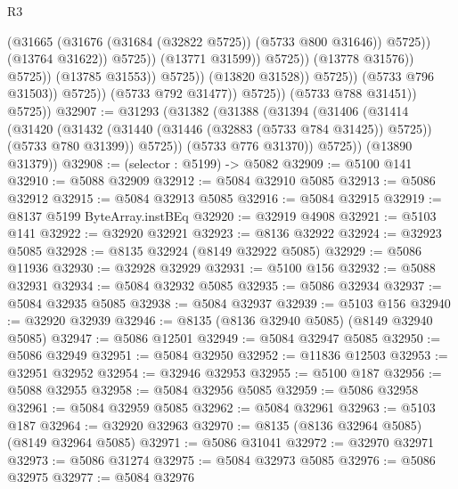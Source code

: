 \begin{lexlean}{R3}
\begin{coremodule}
                                                      (@31665
                                                        (@31676
                                                          (@31684 (@32822 @5725))
                                                          (@5733 @800 @31646))
                                                        @5725))
                                                    (@13764 @31622))
                                                  @5725))
                                              (@13771 @31599))
                                            @5725))
                                        (@13778 @31576))
                                      @5725))
                                  (@13785 @31553))
                                @5725))
                            (@13820 @31528))
                          @5725))
                      (@5733 @796 @31503))
                    @5725))
                (@5733 @792 @31477))
              @5725))
          (@5733 @788 @31451))
        @5725))
@32907 := @31293
    (@31382
      (@31388
        (@31394
          (@31406
            (@31414
              (@31420
                (@31432 (@31440 (@31446 (@32883 (@5733 @784 @31425)) @5725)) (@5733 @780 @31399))
                @5725))
            (@5733 @776 @31370))
          @5725))
      (@13890 @31379))
@32908 := (selector : @5199) -> @5082
@32909 := @5100 @141
@32910 := @5088 @32909
@32912 := @5084 @32910 @5085
@32913 := @5086 @32912
@32915 := @5084 @32913 @5085
@32916 := @5084 @32915
@32919 := @8137 @5199 ByteArray.instBEq
@32920 := @32919 @4908
@32921 := @5103 @141
@32922 := @32920 @32921
@32923 := @8136 @32922
@32924 := @32923 @5085
@32928 := @8135 @32924 (@8149 @32922 @5085)
@32929 := @5086 @11936
@32930 := @32928 @32929
@32931 := @5100 @156
@32932 := @5088 @32931
@32934 := @5084 @32932 @5085
@32935 := @5086 @32934
@32937 := @5084 @32935 @5085
@32938 := @5084 @32937
@32939 := @5103 @156
@32940 := @32920 @32939
@32946 := @8135 (@8136 @32940 @5085) (@8149 @32940 @5085)
@32947 := @5086 @12501
@32949 := @5084 @32947 @5085
@32950 := @5086 @32949
@32951 := @5084 @32950
@32952 := @11836 @12503
@32953 := @32951 @32952
@32954 := @32946 @32953
@32955 := @5100 @187
@32956 := @5088 @32955
@32958 := @5084 @32956 @5085
@32959 := @5086 @32958
@32961 := @5084 @32959 @5085
@32962 := @5084 @32961
@32963 := @5103 @187
@32964 := @32920 @32963
@32970 := @8135 (@8136 @32964 @5085) (@8149 @32964 @5085)
@32971 := @5086 @31041
@32972 := @32970 @32971
@32973 := @5086 @31274
@32975 := @5084 @32973 @5085
@32976 := @5086 @32975
@32977 := @5084 @32976

\end{coremodule}
\end{lexlean}
